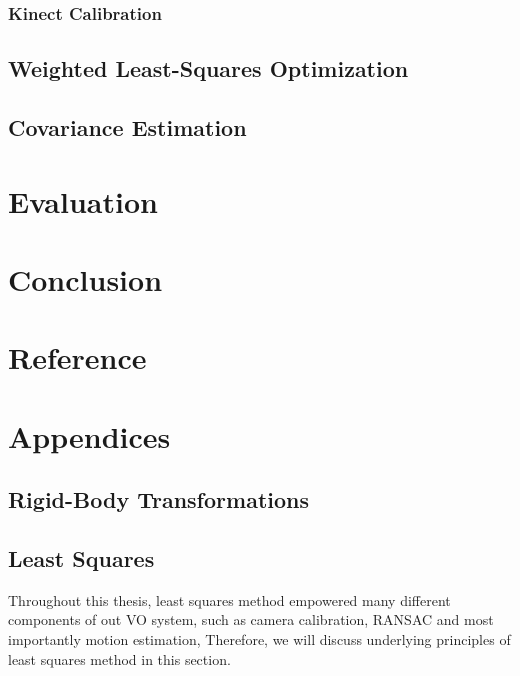 \documentclass[a4paper]{report}
\numberwithin{figure}{section}
\begin{document}
\subsection{Kinect Calibration} \label{sb_sc_kinect_calibration}

\section{Weighted Least-Squares Optimization} \label{sc_weighted_lsq}

\section{Covariance Estimation} \label{sc_covariance_estim}

\chapter{Evaluation} \label{cp_evaluation}

\chapter{Conclusion} \label{cp_conc}

\chapter{Reference} \label{cp_ref}


\chapter{Appendices} \label{cp_appendices}

\section{Rigid-Body Transformations} \label{sc_rigid_body_transformations}


\section{Least Squares}\label{sc_least_squares}

Throughout this thesis, least squares method empowered many different components 
of out VO system, 
such as camera calibration, RANSAC and most importantly motion estimation, 
Therefore, we will discuss underlying principles of least squares method in this section.
\end{document}
